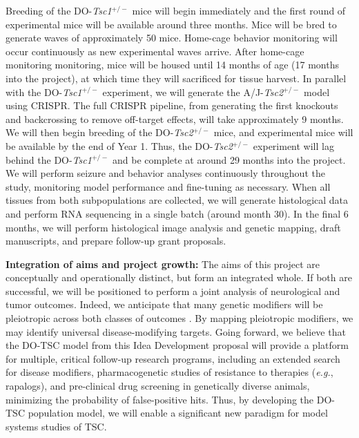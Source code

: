 \documentclass[
  12pt,
]{article}
\begin{document}
Breeding of the DO-\textit{Tsc1}\(^{+/-}\) mice will begin immediately
and the first round of experimental mice will be available around three
months. Mice will be bred to generate waves of approximately 50 mice.
Home-cage behavior monitoring will occur continuously as new
experimental waves arrive. After home-cage monitoring monitoring, mice
will be housed until 14 months of age (17 months into the project), at
which time they will sacrificed for tissue harvest. In parallel with the
DO-\textit{Tsc1}\(^{+/-}\) experiment, we will generate the
A/J-\textit{Tsc2}\(^{+/-}\) model using CRISPR. The full CRISPR
pipeline, from generating the first knockouts and backcrossing to remove
off-target effects, will take approximately 9 months. We will then begin
breeding of the DO-\textit{Tsc2}\(^{+/-}\) mice, and experimental mice
will be available by the end of Year 1. Thus, the
DO-\textit{Tsc2}\(^{+/-}\) experiment will lag behind the
DO-\textit{Tsc1}\(^{+/-}\) and be complete at around 29 months into the
project. We will perform seizure and behavior analyses continuously
throughout the study, monitoring model performance and fine-tuning as
necessary. When all tissues from both subpopulations are collected, we
will generate histological data and perform RNA sequencing in a single
batch (around month 30). In the final 6 months, we will perform
histological image analysis and genetic mapping, draft manuscripts, and
prepare follow-up grant proposals.

\textbf{Integration of aims and project growth:} The aims of this
project are conceptually and operationally distinct, but form an
integrated whole. If both are successful, we will be positioned to
perform a joint analysis of neurological and tumor outcomes. Indeed, we
anticipate that many genetic modifiers will be pleiotropic across both
classes of outcomes \cite{28592500}. By mapping pleiotropic modifiers,
we may identify universal disease-modifying targets. Going forward, we
believe that the DO-TSC model from this Idea Development proposal will
provide a platform for multiple, critical follow-up research programs,
including an extended search for disease modifiers, pharmacogenetic
studies of resistance to therapies (\textit{e.g.}, rapalogs), and
pre-clinical drug screening in genetically diverse animals, minimizing
the probability of false-positive hits. Thus, by developing the DO-TSC
population model, we will enable a significant new paradigm for model
systems studies of TSC.

\pagebreak


\end{document}
